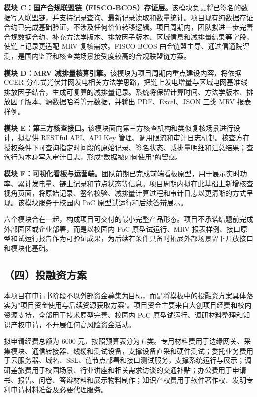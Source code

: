\documentclass[12pt,a4paper]{article}
\begin{document}
\textbf{模块 C：国产合规联盟链（FISCO-BCOS）存证层。}该模块负责将已签名的数据写入联盟链，并支持记录查询、最新记录读取和数量统计。项目现有纯数据存证合约已完成基础验证，不涉及任何价值转移逻辑。项目周期内，团队拟进一步完善合规数据合约，补充方法学版本、排放因子版本、区域信息和减排量结果等字段，使链上记录更适配 MRV 复核需求。FISCO-BCOS 由金链盟主导、通过信通院评测，是国内监管和核查类场景接受度较高的合规联盟链方案。

\textbf{模块 D：MRV 减排量核算引擎。}该模块为项目周期内重点建设内容，将依据 CCER 分布式光伏并网发电相关方法学思路，把链上发电增量与区域电网基准线排放因子结合，生成可复算的减排量记录。系统将保留计算时间、方法学版本、排放因子版本、源数据哈希等元数据，并输出 PDF、Excel、JSON 三类 MRV 报表样例。

\textbf{模块 E：第三方核查接口。}该模块面向第三方核查机构和类似复核场景进行设计，拟提供 RESTful API、API Key 管理、调用限流和审计日志机制。核查方在授权条件下可查询指定时间段的原始记录、签名状态、减排量明细和汇总结果；查询行为本身写入审计日志，形成"数据被如何使用"的留痕。

\textbf{模块 F：可视化看板与运营端。}团队前期已完成前端看板原型，用于展示实时功率、累计发电量、链上记录和节点状态等信息。项目周期内拟在此基础上新增核查视角页面，将原始记录、签名校验、减排量计算过程和审计日志以更清晰的方式呈现。该模块服务于校园内 PoC 原型试运行和后续答辩展示。

六个模块合在一起，构成项目可交付的最小完整产品形态。项目不承诺结题前完成外部园区或企业部署，而是以校园内 PoC 原型试运行、MRV 报表样例、接口原型和试运行报告作为可验证成果，为后续若条件具备时拓展外部场景留下开放接口和模块化基础。


\subsection*{（四）投融资方案}

本项目在申请书阶段不以外部资金募集为目标，而是将模板中的投融资方案具体落实为"项目资金使用与后续资源获取方案"。项目资金主要来自大创项目经费和校内资源支持，全部用于技术原型完善、校园内 PoC 原型试运行、调研材料整理和知识产权申请，不开展任何高风险资金活动。

拟申请经费总额为 6000 元，按照预算表分为五类。专用材料费用于边缘网关、采集模块、通信转接器、线缆和测试设备，支撑设备直采和硬件测试；委托业务费用于云服务器、域名、SSL、链节点部署和接口测试服务，支撑系统运行与展示；调研差旅费用于校园场景、行业讲座和相关需求访谈的交通补贴；办公费用于申请书、报告、问卷、答辩材料和展示物料制作；知识产权费用于软件著作权、发明专利申请材料准备及必要代理服务。
\end{document}
